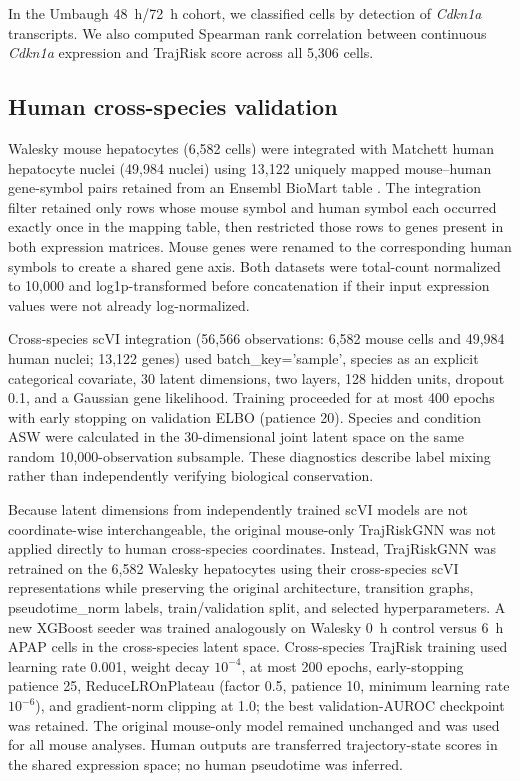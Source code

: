In the Umbaugh 48~h/72~h cohort, we classified cells by detection of \textit{Cdkn1a} transcripts. We also computed Spearman rank correlation between continuous \textit{Cdkn1a} expression and TrajRisk score across all 5,306 cells.

\subsection*{Human cross-species validation}

Walesky mouse hepatocytes (6,582 cells) were integrated with Matchett human hepatocyte nuclei (49,984 nuclei) using 13,122 uniquely mapped mouse--human gene-symbol pairs retained from an Ensembl BioMart table \cite{ref121}. The integration filter retained only rows whose mouse symbol and human symbol each occurred exactly once in the mapping table, then restricted those rows to genes present in both expression matrices. Mouse genes were renamed to the corresponding human symbols to create a shared gene axis. Both datasets were total-count normalized to 10,000 and log1p-transformed before concatenation if their input expression values were not already log-normalized.

Cross-species scVI integration (56,566 observations: 6,582 mouse cells and 49,984 human nuclei; 13,122 genes) used batch\_key='sample', species as an explicit categorical covariate, 30 latent dimensions, two layers, 128 hidden units, dropout 0.1, and a Gaussian gene likelihood. Training proceeded for at most 400 epochs with early stopping on validation ELBO (patience 20). Species and condition ASW were calculated in the 30-dimensional joint latent space on the same random 10,000-observation subsample. These diagnostics describe label mixing rather than independently verifying biological conservation.

Because latent dimensions from independently trained scVI models are not coordinate-wise interchangeable, the original mouse-only TrajRiskGNN was not applied directly to human cross-species coordinates. Instead, TrajRiskGNN was retrained on the 6,582 Walesky hepatocytes using their cross-species scVI representations while preserving the original architecture, transition graphs, pseudotime\_norm labels, train/validation split, and selected hyperparameters. A new XGBoost seeder was trained analogously on Walesky 0~h control versus 6~h APAP cells in the cross-species latent space. Cross-species TrajRisk training used learning rate 0.001, weight decay \(10^{-4}\), at most 200 epochs, early-stopping patience 25, ReduceLROnPlateau (factor 0.5, patience 10, minimum learning rate \(10^{-6}\)), and gradient-norm clipping at 1.0; the best validation-AUROC checkpoint was retained. The original mouse-only model remained unchanged and was used for all mouse analyses. Human outputs are transferred trajectory-state scores in the shared expression space; no human pseudotime was inferred.

